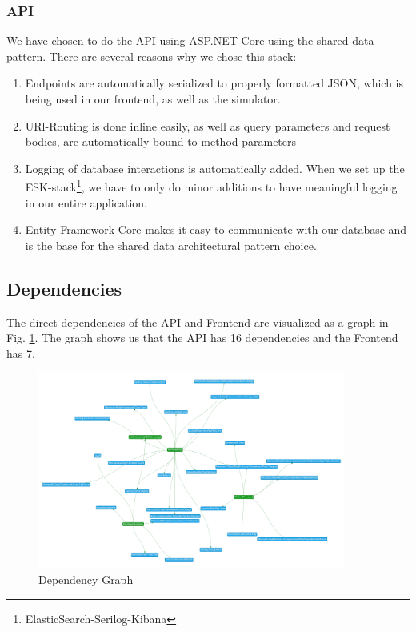 \documentclass[10pt]{article}
\begin{document}
\subsubsection{API}
\label{apidisc}
We have chosen to do the API using ASP.NET Core using the shared data pattern. There are several reasons why we chose this stack:
\begin{enumerate}
    \item Endpoints are automatically serialized to properly formatted JSON, which is being used in our frontend, as well as the simulator.
    \item URl-Routing is done inline easily, as well as query parameters and request bodies, are automatically bound to method parameters
    \item Logging of database interactions is automatically added. When we set up the ESK-stack\footnote{ElasticSearch-Serilog-Kibana}, we have to only do minor additions to have meaningful logging in our entire application.
    \item Entity Framework Core makes it easy to communicate with our database and is the base for the shared data architectural pattern choice.
\end{enumerate}
\subsection{Dependencies}
The direct dependencies of the API and Frontend are visualized as a graph in Fig. \ref{fig:depgrapg}. The graph shows us that the API has 16 dependencies and the Frontend has 7.
\begin{figure} [H]
  \centering
  \includegraphics[width=0.9\textwidth]{images/dependencygraph.png}
  \caption{Dependency Graph}
  \label{fig:depgrapg}
\end{figure}
\end{document}
